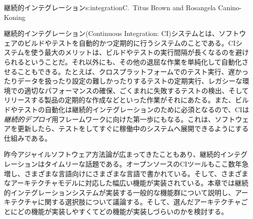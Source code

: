 \begin{aosachapter}{継続的インテグレーション}{s:integration}{C.\ Titus Brown and Rosangela Canino-Koning}

継続的インテグレーション(Continuous Integration: CI)システムとは、ソフトウェアのビルドやテストを自動的かつ定期的に行うシステムのことである。CIシステムを使う最大のメリットは、ビルドやテストの実行間隔が長くなるのを避けられるということだ。それ以外にも、その他の退屈な作業を単純化して自動化させることもできる。たとえば、クロスプラットフォームでのテスト実行、遅かったりデータを扱ったり設定の難しかったりするテストの定期実行、レガシーな環境での適切なパフォーマンスの確保、ごくまれに失敗するテストの検出、そしてリリースする製品の定期的な作成などといった作業がそれにあたる。また、ビルドやテストの自動化は継続的インテグレーションのために必須となるので、CIは\emph{継続的デプロイ}用フレームワークに向けた第一歩にもなる。これは、ソフトウェアを更新したら、テストをしてすぐに稼働中のシステムへ展開できるようにする仕組みである。

昨今アジャイルソフトウェア方法論が広まってきたこともあり、継続的インテグレーションはタイムリーな話題である。オープンソースのCIツールもここ数年急増し、さまざまな言語向けにさまざまな言語で書かれている。そして、さまざまなアーキテクチャモデルに対応した幅広い機能が実装されている。本章では継続的インテグレーションシステムが実装する一般的な機能群について説明し、アーキテクチャに関する選択肢について議論する。そして、選んだアーキテクチャごとにどの機能が実装しやすくてどの機能が実装しづらいのかを検討する。
 

\end{aosachapter}
